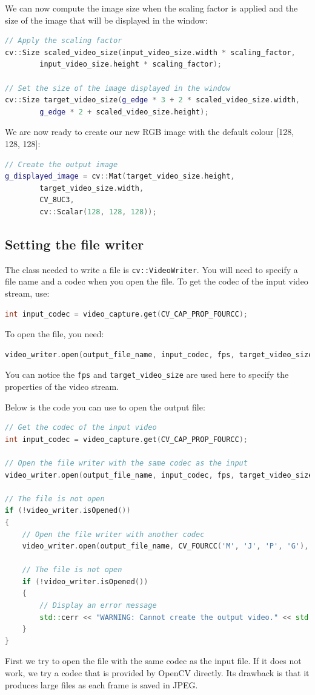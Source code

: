 \documentclass[english,a4paper,12pt,oneside]{article}
\begin{document}
We can now compute the image size when the scaling factor is applied and the size of the image that will be displayed in the window:
\begin{lstlisting}[language=c++]
// Apply the scaling factor
cv::Size scaled_video_size(input_video_size.width * scaling_factor,
        input_video_size.height * scaling_factor);

// Set the size of the image displayed in the window
cv::Size target_video_size(g_edge * 3 + 2 * scaled_video_size.width,
        g_edge * 2 + scaled_video_size.height);
\end{lstlisting}

We are now ready to create our new RGB image with the default colour [128, 128, 128]:
\begin{lstlisting}[language=c++]
// Create the output image
g_displayed_image = cv::Mat(target_video_size.height,
        target_video_size.width,
        CV_8UC3,
        cv::Scalar(128, 128, 128));
\end{lstlisting}




\subsection{Setting the file writer}
The class needed to write a file is \verb+cv::VideoWriter+. 
You will need to specify a file name and a codec when you open the file. 
To get the codec of the input video stream, use:
\begin{lstlisting}[language=c++]
int input_codec = video_capture.get(CV_CAP_PROP_FOURCC);
\end{lstlisting}
To open the file, you need:
\begin{lstlisting}[language=c++]
video_writer.open(output_file_name, input_codec, fps, target_video_size, true);
\end{lstlisting}
You can notice the \verb+fps+ and \verb+target_video_size+ are used here to specify the properties of the video stream. 

Below is the code you can use to open the output file:
\begin{lstlisting}[language=c++]
// Get the codec of the input video
int input_codec = video_capture.get(CV_CAP_PROP_FOURCC);

// Open the file writer with the same codec as the input
video_writer.open(output_file_name, input_codec, fps, target_video_size, true);

// The file is not open
if (!video_writer.isOpened())
{
	// Open the file writer with another codec
	video_writer.open(output_file_name, CV_FOURCC('M', 'J', 'P', 'G'), fps, target_video_size, true);

	// The file is not open
	if (!video_writer.isOpened())
	{
		// Display an error message
		std::cerr << "WARNING: Cannot create the output video." << std::endl;
	}
}
\end{lstlisting}
First we try to open the file with the same codec as the input file. 
If it does not work, we try a codec that is provided by OpenCV directly. 
Its drawback is that it produces large files as each frame is saved in JPEG. 
\end{document}
